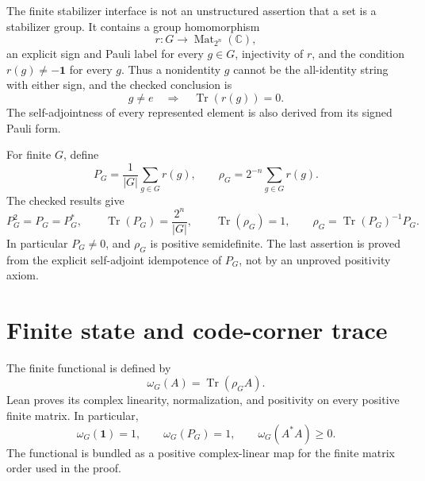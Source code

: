 \documentclass[11pt,reqno]{amsart}
\numberwithin{equation}{section}
\theoremstyle{definition}
\theoremstyle{remark}
\newcommand{\bbC}{\mathbb C}
\newcommand{\id}{\mathbf 1}
\newcommand{\Tr}{\operatorname{Tr}}
\begin{document}
The finite stabilizer interface is not an unstructured assertion that a set
is a stabilizer group.  It contains a group homomorphism
\begin{equation}
  r:G\longrightarrow \operatorname{Mat}_{2^n}(\bbC),
  \label{eq:finite_representation}
\end{equation}
an explicit sign and Pauli label for every $g\in G$, injectivity of $r$, and
the condition $r(g)\neq-\id$ for every $g$.  Thus a nonidentity $g$ cannot be
the all-identity string with either sign, and the checked conclusion is
\begin{equation}
  g\neq e\quad\Longrightarrow\quad\Tr(r(g))=0.
  \label{eq:nonidentity_traceless}
\end{equation}
The self-adjointness of every represented element is also derived from its
signed Pauli form.

For finite $G$, define
\begin{equation}
  P_G=\frac{1}{\lvert G\rvert}\sum_{g\in G}r(g),
  \qquad
  \rho_G=2^{-n}\sum_{g\in G}r(g).
  \label{eq:finite_projector_density}
\end{equation}
The checked results give
\begin{equation}
  P_G^2=P_G=P_G^*,
  \qquad
  \Tr(P_G)=\frac{2^n}{\lvert G\rvert},
  \qquad
  \Tr(\rho_G)=1,
  \qquad
  \rho_G=\Tr(P_G)^{-1}P_G.
  \label{eq:finite_density_identities}
\end{equation}
In particular $P_G\neq0$, and $\rho_G$ is positive semidefinite.  The last
assertion is proved from the explicit self-adjoint idempotence of $P_G$, not
by an unproved positivity axiom.

\section{Finite state and code-corner trace}
\label{sec:finite_state}

The finite functional is defined by
\begin{equation}
  \omega_G(A)=\Tr(\rho_G A).
  \label{eq:finite_state_functional}
\end{equation}
Lean proves its complex linearity, normalization, and positivity on every
positive finite matrix.  In particular,
\begin{equation}
  \omega_G(\id)=1,
  \qquad
  \omega_G(P_G)=1,
  \qquad
  \omega_G(A^*A)\geq0.
  \label{eq:finite_state_properties}
\end{equation}
The functional is bundled as a positive complex-linear map for the finite
matrix order used in the proof.
\end{document}
